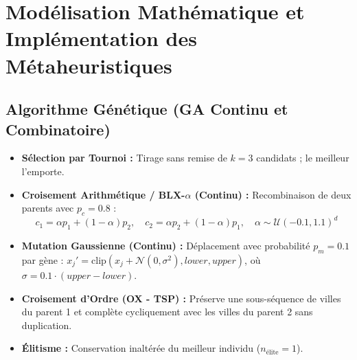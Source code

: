 \documentclass[11pt,a4paper]{article}
\begin{document}
\section{Modélisation Mathématique et Implémentation des Métaheuristiques}

\subsection{Algorithme Génétique (GA Continu et Combinatoire)}
\begin{itemize}\setlength{\itemsep}{0.1em}
    \item \textbf{Sélection par Tournoi :} Tirage sans remise de $k=3$ candidats ; le meilleur l'emporte.
    \item \textbf{Croisement Arithmétique / BLX-$\alpha$ (Continu) :} Recombinaison de deux parents avec $p_c=0.8$ :
    \begin{equation}
        c_1 = \alpha p_1 + (1 - \alpha) p_2, \quad c_2 = \alpha p_2 + (1 - \alpha) p_1, \quad \alpha \sim \mathcal{U}(-0.1, 1.1)^d
    \end{equation}
    \item \textbf{Mutation Gaussienne (Continu) :} Déplacement avec probabilité $p_m=0.1$ par gène : $x_j' = \text{clip}(x_j + \mathcal{N}(0, \sigma^2), lower, upper)$, où $\sigma = 0.1 \cdot (upper - lower)$.
    \item \textbf{Croisement d'Ordre (OX - TSP) :} Préserve une sous-séquence de villes du parent 1 et complète cycliquement avec les villes du parent 2 sans duplication.
    \item \textbf{Élitisme :} Conservation inaltérée du meilleur individu ($n_{\text{élite}}=1$).
\end{itemize}
\end{document}
